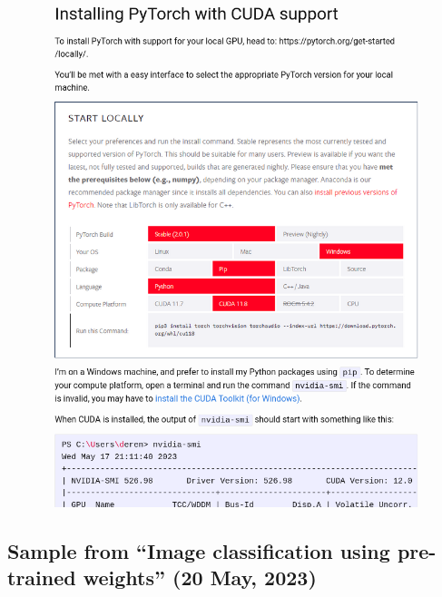 \begin{figure}[!ht]
    \centering
    \includegraphics[width=\textwidth]{images/q1_sample_of_post_2.png}
\end{figure}

\newpage

\subsection*{Sample from ``Image classification using pre-trained weights'' (20 May, 2023)}

